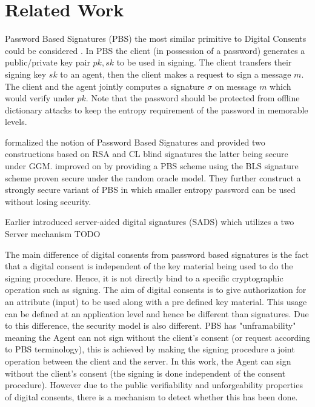 \section{Related Work}

Password Based Signatures (PBS) the most similar primitive to Digital Consents could be considered . In PBS the client (in possession of a password) generates a public/private key pair $pk, sk$ to be used in signing.  The client transfers their signing key $sk$ to an agent, then the client makes a request to sign a message $m$. The client and the agent jointly computes a signature $\sigma$ on message $m$ which would verify under $pk$. Note that the password should be protected from offline dictionary attacks to keep the entropy requirement of the password in memorable levels.

\cite{GT12} formalized the notion of Password Based Signatures and provided two constructions based on RSA and CL blind signatures the latter being secure under GGM. \cite{JKR13} improved on \cite{GT12} by providing a PBS scheme using the BLS signature scheme proven secure under the random oracle model. They further construct a strongly secure variant of PBS in which smaller entropy password can be used without losing security.

Earlier \cite{HWF05} introduced server-aided digital signatures (SADS) which utilizes a two Server mechanism TODO

The main difference of digital consents from password based signatures is the fact that a digital consent is independent of the key material being used to do the signing procedure. Hence, it is not directly bind to a specific cryptographic operation such as signing. The aim of digital consents is to give authorization for an attribute (input) to be used along with a pre defined key material. This usage can be defined at an application level and hence be different than signatures. Due to this difference, the security model is also different. PBS has "unframability" meaning the Agent can not sign without the client's consent (or request according to PBS terminology), this is achieved by making the signing procedure a joint operation between the client and the server. In this work, the Agent can sign without the client's consent (the signing is done independent of the consent procedure). However due to the public verifiability and unforgeability properties of digital consents, there is a mechanism to detect whether this has been done.